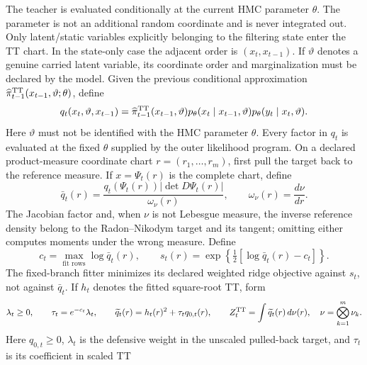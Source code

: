 The teacher is evaluated conditionally at the current HMC parameter
\(\theta\).  The parameter is not an additional random coordinate and is never
integrated out.  Only latent/static variables explicitly belonging to the
filtering state enter the TT chart.  In the state-only case the adjacent order
is \((x_t,x_{t-1})\).  If \(\vartheta\) denotes a genuine carried latent
variable, its coordinate order and marginalization must be declared by the
model.  Given the previous conditional approximation
\(\widehat\pi_{t-1}^{\rm TT}(x_{t-1},\vartheta;\theta)\), define
\begin{equation}
 q_t(x_t,\vartheta,x_{t-1})
 =\widehat\pi_{t-1}^{\rm TT}(x_{t-1},\vartheta)
   p_\theta(x_t\mid x_{t-1},\vartheta)
   p_\theta(y_t\mid x_t,\vartheta).
 \label{eq:bf-eot-tt-teacher-adjacent-target}
\end{equation}
Here \(\vartheta\) must not be identified with the HMC parameter \(\theta\).
Every factor in \(q_t\) is evaluated at the fixed \(\theta\) supplied by the
outer likelihood program.
On a declared product-measure coordinate chart
\(r=(r_1,\ldots,r_m)\), first pull the target back to the reference measure.
If \(x=\Psi_t(r)\) is the complete chart, define
\begin{equation}
 \bar q_t(r)=\frac{q_t(\Psi_t(r))\left|\det D\Psi_t(r)\right|}
 {\omega_\nu(r)},\qquad
 \omega_\nu(r)=\frac{d\nu}{dr}.
 \label{eq:bf-eot-tt-teacher-chart-pullback}
\end{equation}
The Jacobian factor and, when \(\nu\) is not Lebesgue measure, the inverse
reference density belong to the Radon--Nikodym target and its tangent; omitting
either computes moments under the wrong measure.  Define
\begin{equation}
 c_t=\max_{\text{fit rows}}\log\bar q_t(r),\qquad
 s_t(r)=\exp\!\left\{\tfrac12[\log\bar q_t(r)-c_t]\right\}.
 \label{eq:bf-eot-tt-teacher-square-root-target}
\end{equation}
The fixed-branch fitter minimizes its declared weighted ridge objective
against \(s_t\), not against \(\bar q_t\).  If \(h_t\) denotes the fitted
square-root TT, form
\begin{equation}
 \lambda_t\geq0,\qquad
 \tau_t=e^{-c_t}\lambda_t,\qquad
 \widetilde q_t(r)=h_t(r)^2+\tau_tq_{0,t}(r),\qquad
 Z_t^{\rm TT}=\int\widetilde q_t(r)\,d\nu(r),
 \quad \nu=\bigotimes_{k=1}^m\nu_k.
 \label{eq:bf-eot-tt-teacher-squared-density}
\end{equation}
Here \(q_{0,t}\geq0\), \(\lambda_t\) is the defensive weight in the
unscaled pulled-back target, and \(\tau_t\) is its coefficient in scaled TT
